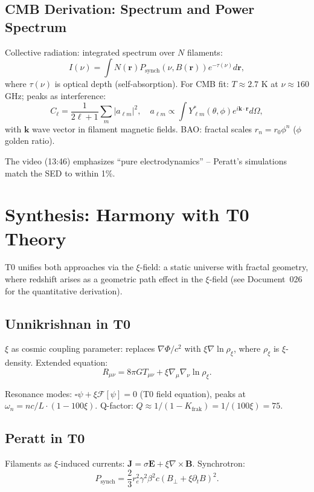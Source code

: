 	\subsection{CMB Derivation: Spectrum and Power Spectrum}
	Collective radiation: integrated spectrum over $N$ filaments:
	\begin{equation}
		I(\nu) = \int N(\mathbf{r}) P_{\text{synch}}(\nu, B(\mathbf{r})) e^{-\tau(\nu)} d\mathbf{r},
	\end{equation}
	where $\tau(\nu)$ is optical depth (self-absorption). For CMB fit: $T \approx 2.7$ K at $\nu \approx 160$ GHz; peaks as interference:
	\begin{equation}
		C_\ell = \frac{1}{2\ell + 1} \sum_m |a_{\ell m}|^2, \quad a_{\ell m} \propto \int Y_{\ell m}^*(\theta, \phi) e^{i \mathbf{k} \cdot \mathbf{r}} d\Omega,
	\end{equation}
	with $\mathbf{k}$ wave vector in filament magnetic fields. BAO: fractal scales $r_n = r_0 \phi^n$ ($\phi$ golden ratio).
	
	The video (13:46) emphasizes ``pure electrodynamics'' -- Peratt's simulations match the SED to within 1\%.
	
	\section{Synthesis: Harmony with T0 Theory}
	T0 unifies both approaches via the $\xi$-field: a static universe with fractal geometry, where redshift arises as a geometric path effect in the $\xi$-field (see Document~026 for the quantitative derivation).
	
	\subsection{Unnikrishnan in T0}
	$\xi$ as cosmic coupling parameter: replaces $\nabla \Phi / c^2$ with $\xi \nabla \ln \rho_\xi$, where $\rho_\xi$ is $\xi$-density. Extended equation:
	\begin{equation}
		R_{\mu\nu} = 8\pi G T_{\mu\nu} + \xi \nabla_\mu \nabla_\nu \ln \rho_\xi.
	\end{equation}
	
	Resonance modes: $\square \psi + \xi \mathcal{F}[\psi] = 0$ (T0 field equation), peaks at $\omega_n = n c / L \cdot (1 - 100 \xi)$. Q-factor: $Q \approx 1 / (1 - K_{\text{frak}}) = 1/(100\xi) = 75$.
	
	\subsection{Peratt in T0}
	Filaments as $\xi$-induced currents: $\mathbf{J} = \sigma \mathbf{E} + \xi \nabla \times \mathbf{B}$. Synchrotron:
	\begin{equation}
		P_{\text{synch}} = \frac{2}{3} r_e^2 \gamma^2 \beta^2 c (B_\perp + \xi \partial_t B)^2.
	\end{equation}
	

